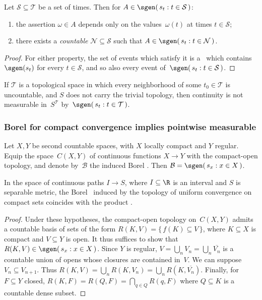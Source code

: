 \begin	{proposition}
Let \( \mathcal S \subseteq \mathcal T \) be a set of times.
Then for \( A \in \sgen(\, s_t : t \in \mathcal S \,) \):
\begin	{enumerate}
\item	the assertion \( \omega \in A \) depends only on the values~$\omega(t)$
	at times \( t \in \mathcal S \);
\item	there exists a \emph{countable} \( \mathcal N \subseteq \mathcal S \)
	such that \( A \in \sgen(\, s_t : t \in \mathcal N \,) \).
\end	{enumerate}
\end	{proposition}
\begin	{proof}
For either property, the set of events which satisfy it
is a \salg\ which contains $\sgen(s_t)$ for every \( t \in \mathcal S \),
and so also every event of~\( \sgen(\, s_t : t \in \mathcal S \,) \).
\end	{proof}

\begin	{corollary}
If $\mathcal T$ is a topological space
in which every neighborhood of some \( t_0 \in \mathcal T \) is uncountable,
and $S$ does not carry the trivial topology,
then continuity is not measurable in~$S^{\mathcal T}$
by~\( \sgen(\, s_t : t \in \mathcal T \,) \).
\end	{corollary}


\subsubsection
	{Borel for compact convergence implies pointwise measurable}

\begin	{theorem}
Let $X,Y$ be second countable spaces,
with $X$ locally compact and $Y$ regular.
Equip the space~$C(X,Y)$ of continuous functions \( X \to Y \)
with the compact-open topology,
and denote by~$\mathcal B$ the induced Borel \salg.
Then \( \mathcal B = \sgen(\, s_x : x \in X \,) \).
\end	{theorem}

\begin	{corollary}
In the space of continuous paths \( I \to S \),
where \( I \subseteq \R \) is an interval and $S$ is separable metric,
the Borel \salg\ induced by the topology of uniform convergence on compact sets
coincides with the product \salg.
\end	{corollary}

\begin	{proof}
Under these hypotheses,
the compact-open topology on~$C(X,Y)$ admits a countable basis
of sets of the form \( R(K,V) = \{\, f(K) \subseteq V \,\} \),
where \( K \subseteq X \) is compact and \( V \subseteq Y \) is open.
It thus suffices to show that \( R(K,V) \in \sgen(\, s_x : x \in X \,) \).
Since $Y$ is regular,
\( V = \bigcup_n V_n = \bigcup_n \overline{V_n} \)
is a countable union of opens whose closures are contained in~$V$.
We can suppose \( V_n \subseteq V_{n+1} \).
Thus \( R(K,V) = \bigcup_n R(K,V_n) = \bigcup_n R(K,\overline{V_n}) \).
Finally, for \( F \subseteq Y \) closed,
\( R(K,F) = R(Q,F) = \bigcap_{q \in Q} R(q,F) \)
where \( Q \subseteq K \) is a countable dense subset.
\end	{proof}
